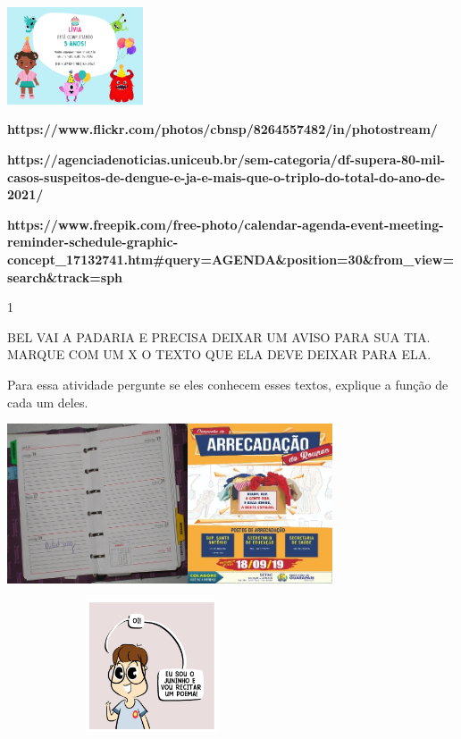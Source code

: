 {{\includegraphics[width=1.58681in,height=1.13333in]{media/image92.png}

\textbf{https://www.flickr.com/photos/cbnsp/8264557482/in/photostream/}

\textbf{https://agenciadenoticias.uniceub.br/sem-categoria/df-supera-80-mil-casos-suspeitos-de-dengue-e-ja-e-mais-que-o-triplo-do-total-do-ano-de-2021/}

\textbf{https://www.freepik.com/free-photo/calendar-agenda-event-meeting-reminder-schedule-graphic-concept\_17132741.htm\#query=AGENDA\&position=30\&from\_view=search\&track=sph}


\num{1}

BEL VAI A PADARIA E PRECISA DEIXAR UM AVISO PARA SUA TIA. MARQUE COM UM
X O TEXTO QUE ELA DEVE DEIXAR PARA ELA.

Para essa atividade pergunte se eles conhecem esses textos, explique a
função de cada um deles.

\includegraphics[width=2.10625in,height=1.86042in]{media/image93.jpeg}\includegraphics[width=1.68611in,height=1.86042in]{media/image94.jpeg}

\includegraphics[width=3.36528in,height=1.53611in]{media/image97.png}

}}

